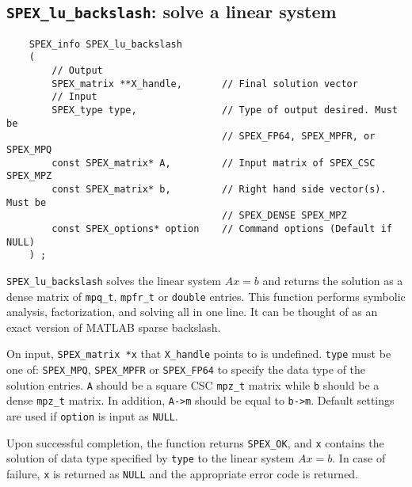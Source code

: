 \documentclass[12pt,oneside]{book}
\theoremstyle{definition}
\begin{document}
\subsection{\texttt{SPEX\_lu\_backslash}: solve a linear system}
\label{ss:SPEX_Left_LU_backslash}
\begin{mdframed}[userdefinedwidth=\textwidth]
{\footnotesize
\begin{verbatim}
    SPEX_info SPEX_lu_backslash
    (
        // Output
        SPEX_matrix **X_handle,       // Final solution vector
        // Input
        SPEX_type type,               // Type of output desired. Must be
                                      // SPEX_FP64, SPEX_MPFR, or SPEX_MPQ
        const SPEX_matrix* A,         // Input matrix of SPEX_CSC SPEX_MPZ
        const SPEX_matrix* b,         // Right hand side vector(s). Must be
                                      // SPEX_DENSE SPEX_MPZ 
        const SPEX_options* option    // Command options (Default if NULL)
    ) ;
\end{verbatim}
} \end{mdframed}

\verb|SPEX_lu_backslash| solves the linear system $Ax=b$ and returns the solution
as a dense matrix of \verb|mpq_t|, \verb|mpfr_t| or \verb|double| entries. This
function performs symbolic analysis, factorization, and solving all in one line. 
It can be thought of as an exact version of MATLAB sparse backslash.

On input, \verb|SPEX_matrix *x| that \verb|X_handle| points to is undefined. \verb|type| must be one of:
\verb|SPEX_MPQ|, \verb|SPEX_MPFR| or \verb|SPEX_FP64| to specify the data type
of the solution entries. \verb|A| should be a square CSC \verb|mpz_t| matrix
while \verb|b| should be a dense \verb|mpz_t| matrix. In addition, \verb|A->m|
should be equal to \verb|b->m|.  Default settings are used if
\verb|option| is input as \verb|NULL|.

Upon successful completion, the function returns \verb|SPEX_OK|, and
\verb|x| contains the solution of data type specified by
\verb|type| to the linear system $Ax=b$. In case of failure, \verb|x| is returned as \verb|NULL| and the appropriate error code is returned.
\end{document}
